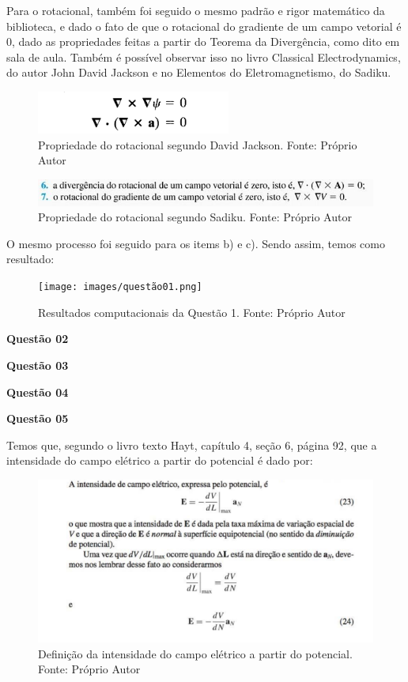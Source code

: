 Para o rotacional, também foi seguido o mesmo padrão e rigor matemático da biblioteca, e dado o fato de que o rotacional do gradiente de um campo vetorial é 0, dado as propriedades feitas a partir do Teorema da Divergência, como dito em sala de aula. Também é possível observar isso no livro Classical Electrodynamics, do autor John David Jackson e no Elementos do Eletromagnetismo, do Sadiku. 

\begin{figure}[!h]
	\centering
	\includegraphics[scale= 0.6]{images/rotacional.png}
	\caption{Propriedade do rotacional segundo David Jackson. Fonte: Próprio Autor}
\end{figure}

\begin{figure}[!h]
	\centering
	\includegraphics[scale= 0.6]{images/rotacional1.png}
	\caption{Propriedade do rotacional segundo Sadiku. Fonte: Próprio Autor}
\end{figure}

O mesmo processo foi seguido para os items b) e c). Sendo assim, temos como resultado: 

\begin{figure}[!h]
	\centering
	\texttt{[image: images/questão01.png]}
	\caption{Resultados computacionais da Questão 1. Fonte: Próprio Autor}
\end{figure}

\textbf{Questão 02}

\textbf{Questão 03}

\textbf{Questão 04}

\textbf{Questão 05}

Temos que, segundo o livro texto Hayt, capítulo 4, seção 6, página 92, que a intensidade do campo elétrico a partir do potencial é dado por: 

\begin{figure}[!h]
	\centering
	\includegraphics[scale= 0.6]{images/intensidade1.png}
	\caption{Definição da intensidade do campo elétrico a partir do potencial. Fonte: Próprio Autor}
\end{figure}

